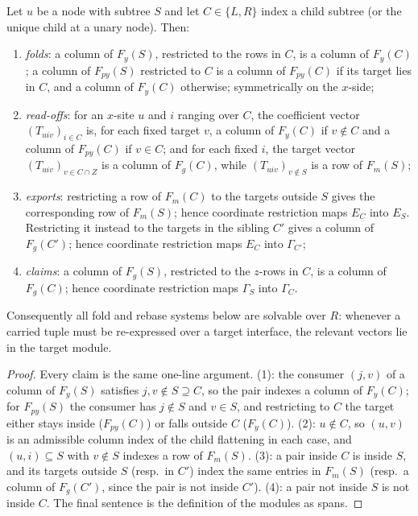 \documentclass[a4paper,UKenglish,autoref,anonymous]{lipics-v2021}
\newcommand{\R}{R}                                   %
\begin{document}
\begin{lemma}
\label{lem:restrict}
Let $u$ be a node with subtree $S$ and let $C \in \{L, R\}$ index a
child subtree (or the unique child at a unary node). Then:
\begin{enumerate}
\item \emph{folds}: a column of $F_y(S)$, restricted to the rows in $C$,
  is a column of $F_y(C)$; a column of $F_{py}(S)$ restricted to $C$ is
  a column of $F_{py}(C)$ if its target lies in $C$, and a column of
  $F_y(C)$ otherwise; symmetrically on the $x$-side;
\item \emph{read-offs}: for an $x$-site $u$ and $i$ ranging over $C$,
  the coefficient vector $(T_{uiv})_{i \in C}$ is, for each fixed target
  $v$, a column of $F_y(C)$ if $v \notin C$ and a column of $F_{py}(C)$
  if $v \in C$; and for each fixed $i$, the target vector $(T_{uiv})_{v
  \in C \cap Z}$ is a column of $F_g(C)$, while $(T_{uiv})_{v \notin S}$
  is a row of $F_m(S)$;
\item \emph{exports}: restricting a row of $F_m(C)$ to the targets
  outside $S$ gives the corresponding row of $F_m(S)$; hence coordinate
  restriction maps $E_C$ into $E_S$. Restricting it instead to the
  targets in the sibling $C'$ gives a column of $F_g(C')$; hence
  coordinate restriction maps $E_C$ into $\Gamma_{C'}$;
\item \emph{claims}: a column of $F_g(S)$, restricted to the $z$-rows in
  $C$, is a column of $F_g(C)$; hence coordinate restriction maps
  $\Gamma_S$ into $\Gamma_C$.
\end{enumerate}
Consequently all fold and rebase systems below are solvable over $\R$:
whenever a carried tuple must be re-expressed over a target interface,
the relevant vectors lie in the target module.
\end{lemma}

\begin{proof}
Every claim is the same one-line argument. (1): the consumer $(j, v)$ of
a column of $F_y(S)$ satisfies $j, v \notin S \supseteq C$, so the pair
indexes a column of $F_y(C)$; for $F_{py}(S)$ the consumer has $j \notin
S$ and $v \in S$, and restricting to $C$ the target either stays inside
($F_{py}(C)$) or falls outside $C$ ($F_y(C)$). (2): $u \notin C$, so
$(u, v)$ is an admissible column index of the child flattening in each
case, and $(u, i) \subseteq S$ with $v \notin S$ indexes a row of
$F_m(S)$. (3): a pair inside $C$ is inside $S$, and its targets outside
$S$ (resp.\ in $C'$) index the same entries in $F_m(S)$ (resp.\ a column
of $F_g(C')$, since the pair is not inside $C'$). (4): a pair not inside
$S$ is not inside $C$. The final sentence is the definition of the
modules as spans.
\end{proof}
\end{document}

